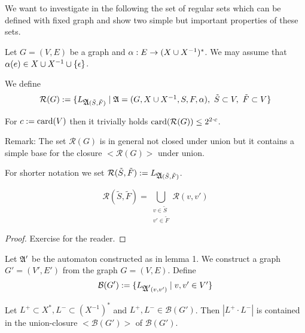 We want to investigate in the following the set of regular sets which can be
defined with fixed graph and show two simple but important properties of these
sets.

Let $G = (V, E)$ be a graph and $\alpha : E \to (X \cup {X}^{-1})^*$. We may
assume that $\alpha(e) \in X \cup {X}^{-1} \cup \mbox{$\{\epsilon\}$}$.

We define
\[ \mathcal{R}(G) := \mbox{$\{L_{\mbox{$\mathfrak{A}$}(\tilde{S},\tilde{F})} \mid \mbox{$\mathfrak{A}$} = (G, X
\cup X^{-1}, S, F, \alpha),\ \tilde{S} \subset V,\ \tilde{F} \subset V\}$} \]

For $c := \mathrm{card}(V)$ then it trivially holds $\mathrm{card}(\mathcal{R}(G)) \leq 2^{2
\cdot c}$.

Remark: The set $\mathcal{R}(G)$ is in general not closed under union but it
contains a simple base for the closure $<\mathcal{R}(G)>$ under union.

For shorter notation we set $\mathcal{R}(\tilde{S},\tilde{F}) :=
L_{\mbox{$\mathfrak{A}$}(\tilde{S},\tilde{F})}$.

\begin{lemma}
\[ \mathcal{R}(\tilde{S},\tilde{F}) = \bigcup_{\substack{v \in \tilde{S}\\v'
\in \tilde{F}}} \mathcal{R}(v, v') \]
\end{lemma}

\begin{proof}
Exercise for the reader.
\end{proof}

Let $\mbox{$\mathfrak{A'}$}$ be the automaton constructed as in lemma 1. We construct a graph
$G' = (V', E')$ from the graph $G = (V, E)$. Define
\[ \mathcal{B}(G') := \mbox{$\{L_{\mbox{$\mathfrak{A'}$}(v, v')} \mid v, v' \in V'\}$} \]

\begin{lemma}
Let $L^+ \subset X^*, L^- \subset (X^{-1})^*$ and $L^+, L^- \in
\mathcal{B}(G')$. Then $|L^+ \cdot L^-|$ is contained in the union-closure
$<\mathcal{B}(G')>$ of $\mathcal{B}(G')$.
\end{lemma}

